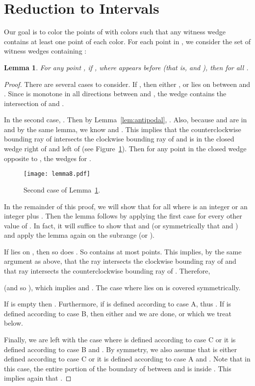 \documentclass[english,11pt]{article}
\newtheorem{lemma}{Lemma}
\begin{document}
\section{Reduction to Intervals}
\label{sec:inter}

Our goal is to color the points of  with  colors such that any witness wedge  contains at least one point of each color.
For each point  in , we consider the set  of witness wedges containing :


\begin{lemma}
\label{lem:oneinterval}
For any point , if , where  appears
before  (that is,   and 
), then  for all .
\end{lemma}
\begin{proof}
There are several cases to consider. If , then either
, or  lies on  between 
and . Since  is  monotone in all directions between
 and , the wedge  contains the
intersection of  and .


In the second case, . 
Then by Lemma~\ref{lem:antipodal}, . Also, because
 and  are in  and by the same lemma, we know
 and . This implies that the
counterclockwise bounding ray  of  intersects the clockwise
bounding ray  of  and  is in the closed wedge  right
of  and left of  (see Figure~\ref{fig:lemma8}). Then for any point  in the closed wedge
 opposite to , the wedges  for
.  

\begin{figure}[htb]
\begin{center}
\texttt{[image: lemma8.pdf]}
\end{center}
\caption{\label{fig:lemma8}Second case of Lemma~\ref{lem:oneinterval}.}
\end{figure}

In the remainder of this proof, we will show that  for
all  where  is an integer or an integer plus
. Then the lemma follows by applying the first case for every
other value of .
In fact, it will suffice to show that 
and  (or symmetrically that 
 and ) and
apply the lemma again on the subrange  (or ).

If  lies on , then so does 
. 
So  contains at most  points. This
implies, by the same argument as above, that the ray  intersects
the clockwise bounding ray of  and that ray
 intersects the counterclockwise bounding ray of 
. Therefore, 
 
(and so ), which implies 
 and
. 
The case where  lies on  is covered symmetrically.

If  is empty then . 
Furthermore, if  is defined according to case A,
 thus 
.
If  is defined according to case B, then either 
 and we are done, or  which
we treat below. 

Finally, we are left with the case where  is defined according
to case C or it is defined according to case B and . By
symmetry, we also assume that  is either defined according to
case C or it is defined according to case A and .
Note that in this case, the entire portion of the boundary of 
between  and  is inside . This implies again that 
.\end{proof}
\end{document}
